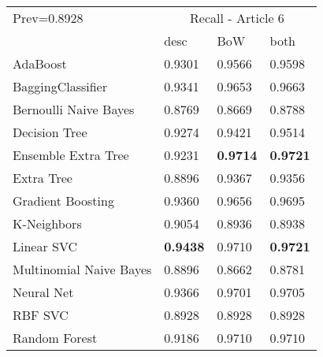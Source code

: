 \begin{tabular}{|l|l|l|l| }
\hline
Prev=0.8928 &  \multicolumn{3}{c|}{Recall - Article 6} \\
\cline{2-4} & desc & BoW & both \\ \hline
AdaBoost                & 0.9301 & 0.9566 & 0.9598\\
BaggingClassifier       & 0.9341 & 0.9653 & 0.9663\\
Bernoulli Naive Bayes   & 0.8769 & 0.8669 & 0.8788\\
Decision Tree           & 0.9274 & 0.9421 & 0.9514\\
Ensemble Extra Tree     & 0.9231 & {\bf 0.9714} & {\bf 0.9721}\\
Extra Tree              & 0.8896 & 0.9367 & 0.9356\\
Gradient Boosting       & 0.9360 & 0.9656 & 0.9695\\
K-Neighbors             & 0.9054 & 0.8936 & 0.8938\\
Linear SVC              & {\bf 0.9438} & 0.9710 & {\bf 0.9721}\\
Multinomial Naive Bayes & 0.8896 & 0.8662 & 0.8781\\
Neural Net              & 0.9366 & 0.9701 & 0.9705\\
RBF SVC                 & 0.8928 & 0.8928 & 0.8928\\
Random Forest           & 0.9186 & 0.9710 & 0.9710\\
\hline
\end{tabular}